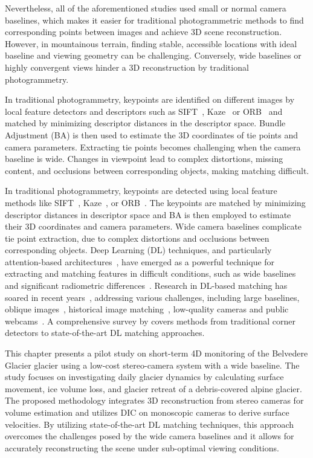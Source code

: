 Nevertheless, all of the aforementioned studies used small or normal camera baselines,
which makes it easier for traditional photogrammetric methods to find corresponding
points between images and achieve 3D scene reconstruction.
However, in mountainous terrain, finding stable, accessible locations with ideal
baseline and viewing geometry can be challenging.
Conversely, wide baselines or highly convergent views hinder a 3D reconstruction by
traditional photogrammetry.

In traditional photogrammetry, keypoints are identified on different images by
local feature detectors and descriptors such as SIFT~\citep{Lowe2004},
Kaze~\citep{Alcantarilla2012} or ORB~\citep{Rublee2011} and matched by minimizing 
descriptor distances in the descriptor space.
Bundle Adjustment (BA) is then used to estimate the 3D coordinates of tie points
and camera parameters.
Extracting tie points becomes challenging when the camera baseline is wide.
Changes in viewpoint lead to complex distortions, missing content, and occlusions between corresponding objects, making matching difficult.

In traditional photogrammetry, keypoints are detected using local feature methods like
SIFT~\citep{Lowe2004}, Kaze~\citep{Alcantarilla2012}, or ORB~\citep{Rublee2011}. 
The keypoints are matched by minimizing descriptor distances in descriptor space and BA is then employed to estimate their 3D coordinates and camera parameters.
Wide camera baselines complicate tie point extraction, due to complex
distortions and occlusions between corresponding objects.
Deep Learning (DL) techniques, and particularly attention-based
architectures~\citep{vaswani2023attention},
have emerged as a powerful technique for extracting and matching features in difficult
conditions, such as wide baselines and significant radiometric
differences~\citep{jin_image_2021,Yao_2021}.
Research in DL-based matching has soared in recent
years~\citep{Chen_2021_handcrafted_to_DL},
addressing various challenges, including large baselines, oblique
images~\citep{Yao_2021}, historical image matching~\citep{Maiwald2021_Historical},
low-quality cameras and public webcams~\citep{wu2021_public_webcams}.
A comprehensive survey by \cite{remondino2022_at_with_dl} covers methods from
traditional corner detectors to state-of-the-art DL matching approaches.

This chapter presents a pilot study on short-term 4D monitoring of the Belvedere Glacier glacier using a low-cost stereo-camera system with a wide baseline. 
The study focuses on investigating daily glacier dynamics by calculating surface movement, ice volume loss, and glacier retreat of a debris-covered alpine glacier.
The proposed methodology integrates 3D reconstruction from stereo cameras for volume
estimation and utilizes DIC on monoscopic cameras to derive surface velocities.
By utilizing state-of-the-art DL matching techniques, this approach overcomes
the challenges posed by the wide camera baselines and it allows for accurately
reconstructing the scene under sub-optimal viewing conditions.

